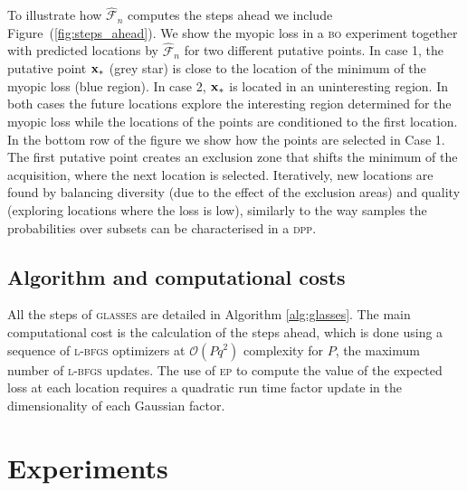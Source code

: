 \documentclass[twoside]{article}
\newcommand{\future}{\mathcal{F}}
\newcommand{\acr}[1]{\textsc{#1}\xspace}
\newcommand{\dpp}{\acr{dpp}}
\newcommand{\us}{\acr{glasses}}
\newcommand{\lbfgs}{\acr{l-bfgs}}
\newcommand{\ep}{\acr{ep}}
\newcommand{\bo}{\acr{bo}}
\begin{document}
To illustrate how $\hat{\future}_n$ computes the steps ahead we include Figure~(\ref{fig:steps_ahead}). We show the myopic loss in a \bo experiment together with predicted locations by $\hat{\future}_n$ for two different putative points. In case 1, the putative point $\mathbf{x}_*$ (grey star) is close to the location of the minimum of the myopic loss (blue region). In case 2, $\mathbf{x}_*$ is located in an uninteresting region. In both cases the future locations explore the interesting region determined for the myopic loss while the locations of the points are conditioned to the first location. In the bottom row of the figure we show how the points are selected in Case 1. The first putative point creates an exclusion zone that shifts the minimum of the acquisition, where the next location is selected. Iteratively, new locations are found by balancing diversity (due to the effect of the exclusion areas) and quality (exploring locations where the loss is low), similarly to the way samples the probabilities over subsets can be characterised in a \dpp \citep{MAL-044}.
 

\subsection{Algorithm and computational costs}
All the steps of \us are detailed in Algorithm \ref{alg:glasses}. The main computational cost is the calculation of the steps ahead, which is done using a sequence of \lbfgs optimizers at $\mathcal{O}(Pq^2)$ complexity for $P$, the maximum number of \lbfgs updates. The use of \ep to compute the value of the expected loss at each location requires a  quadratic run  time  factor  update in the dimensionality of each Gaussian factor.

\section{Experiments}\label{sec:experiments}


\end{document}
